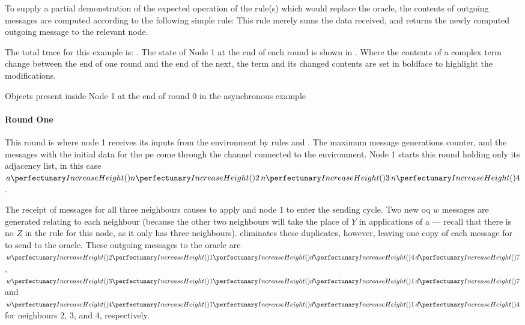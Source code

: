 To supply a partial demonstration of the expected operation of the rule(s) which would replace the oracle, the contents of outgoing messages are computed according to the following simple rule:   This rule merely sums the data received, and returns the newly computed outgoing message to the relevant node.

\setcounter{traces}{-1}

The total trace for this example is: \tracn{{\label{trace:0}}--}{--}{--} \tarr{}  \tarr{}  \tarr{}  \tarr{}  \tarr{}  \tarr{} \tracn{\label{trace:6}--}{--}{--}.  The state of Node 1 at the end of each round is shown in .  Where the contents of a complex term change between the end of one round and the end of the next, the term and its changed contents are set in boldface to highlight the modifications.

\begin{cpobjectsfloat}
\begin{cpobjects}
\end{cpobjects}
\caption{\label{objs:nmp:ex0}Objects present inside Node 1 at the end of round 0 in the asynchronous  example}
\end{cpobjectsfloat}

\paragraph{Round One}
This round is where node 1 receives its inputs from the environment by rules  and .  The maximum message generations counter, and the messages with the initial data for the \gls{pe} come through the channel connected to the environment.  Node 1 starts this round holding only its adjacency list, in this case \(\cpfunc{a}{\cpfunc{n}{2} \, \cpfunc{n}{3} \, \cpfunc{n}{4}}\).

The receipt of messages for all three neighbours causes  to apply and node 1 to enter the sending cycle.  Two new \gls{oq} \(w\) messages are generated relating to each neighbour (because the other two neighbours will take the place of \(Y\) in applications of a --- recall that there is no \(Z\) in the rule for this node, as it only has three neighbours).   eliminates these duplicates, however, leaving one copy of each message for  to send to the oracle.  These outgoing messages to the oracle are \(\cpvw{2}{1}{\cpfunc{d}{4} \, \cpfunc{d}{7}}\), \(\cpvw{3}{1}{\cpfunc{d}{1} \, \cpfunc{d}{7}}\) and \(\cpvw{4}{1}{\cpfunc{d}{1} \, \cpfunc{d}{4}}\) for neighbours 2, 3, and 4, respectively.

